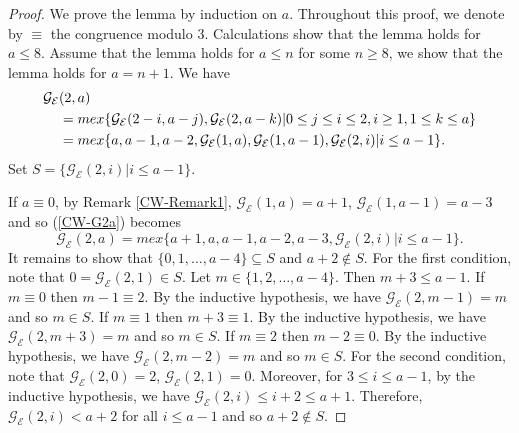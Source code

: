 \documentclass[12pt]{amsart}
\theoremstyle{plain}
\theoremstyle{definition}
\theoremstyle{remark}
\begin{document}
\begin{proof}
We prove the lemma by induction on $a$. Throughout this proof, we denote by $\equiv $ the congruence modulo 3. Calculations show that the lemma holds for $a \leq 8$. Assume that the lemma holds for $a \leq n$ for some $n \geq 8$, we show that the lemma holds for $a = n+1$. We have
\begin{align} \label{CW-G2a}
{\mathcal{G}}_{\mathcal{E}}&(2,a) \notag \\
       &= mex\{{\mathcal{G}}_{\mathcal{E}}(2-i,a-j), {\mathcal{G}}_{\mathcal{E}}(2,a-k) | 0 \leq j \leq i \leq 2, i \geq 1, 1 \leq k \leq a\}  \notag \\
       &= mex \{a,a-1,a-2,{\mathcal{G}}_{\mathcal{E}}(1,a), {\mathcal{G}}_{\mathcal{E}}(1,a-1), {\mathcal{G}}_{\mathcal{E}}(2,i) | i \leq a-1\}.
\end{align}
Set $S = \{{\mathcal{G}}_{\mathcal{E}}(2,i) | i \leq a-1\}$.

If $a \equiv  0$, by Remark \ref{CW-Remark1}, ${\mathcal{G}}_{\mathcal{E}}(1,a) = a+1$, ${\mathcal{G}}_{\mathcal{E}}(1,a-1)=a-3$ and so (\ref{CW-G2a}) becomes
\[{\mathcal{G}}_{\mathcal{E}}(2,a) = mex \{a+1,a,a-1,a-2,a-3, {\mathcal{G}}_{\mathcal{E}}(2,i) | i \leq a-1\}.\]
It remains to show that $\{0, 1, \ldots, a-4\} \subseteq S$ and $a+2 \notin S$. For the first condition, note that $0 = {\mathcal{G}}_{\mathcal{E}}(2,1) \in S$. Let $m \in \{1,2, \ldots, a-4\}$. Then $m+3 \leq a-1$. If $m \equiv  0$ then $m-1 \equiv  2$. By the inductive hypothesis, we have ${\mathcal{G}}_{\mathcal{E}}(2,m-1) = m$ and so $m \in S$. If $m \equiv  1$ then $m+3 \equiv  1$. By the inductive hypothesis, we have ${\mathcal{G}}_{\mathcal{E}}(2,m+3) = m$ and so $m \in S$. If $m \equiv  2$ then $m-2 \equiv  0$. By the inductive hypothesis, we have ${\mathcal{G}}_{\mathcal{E}}(2,m-2) = m$ and so $m \in S$. For the second condition, note that ${\mathcal{G}}_{\mathcal{E}}(2,0) = 2$, ${\mathcal{G}}_{\mathcal{E}}(2,1) = 0$. Moreover, for $3 \leq i \leq a-1$, by the inductive hypothesis, we have ${\mathcal{G}}_{\mathcal{E}}(2,i) \leq i+2 \leq a+1$. Therefore, ${\mathcal{G}}_{\mathcal{E}}(2,i) < a+2$ for all $i \leq a-1 $ and so $a+2 \notin S$.


\end{proof}
\end{document}
